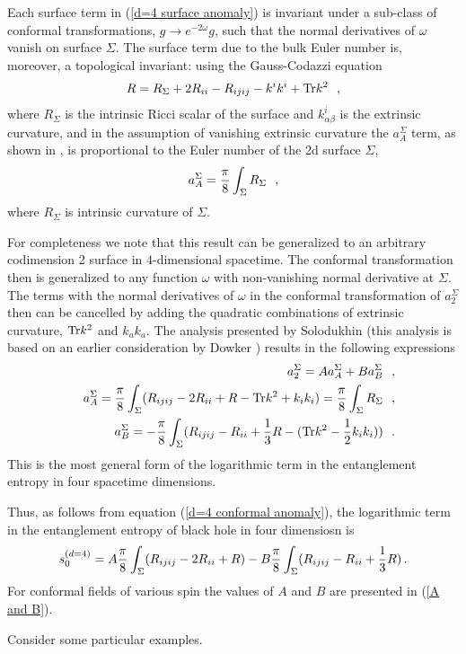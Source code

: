 \documentclass[12pt]{article}
\def\tr{\hbox{Tr}}
\def\be{\begin{eqnarray}}
\def\ee{\end{eqnarray}}
\def\lb{\label}
\begin{document}
Each surface term in (\ref{d=4 surface anomaly}) is invariant
under a sub-class of conformal transformations, $g\rightarrow
e^{-2\omega}g$, such that  the normal derivatives of $\omega$
vanish on surface $\Sigma$. The surface term due to the bulk
Euler number is, moreover, a topological invariant: using the
Gauss-Codazzi equation 
\be R=R_\Sigma +2R_{ii}-R_{ijij}-k^ik^i+\tr
k^2~~,\lb{Gauss-Codazzi} \ee where $R_\Sigma$ is the intrinsic Ricci scalar
of the surface and $k^i_{\alpha\beta}$ is the extrinsic curvature, and in the assumption of
vanishing extrinsic curvature the $a_A^\Sigma$ term, as shown in
\cite{Fursaev:1995ef}, is proportional to the Euler number of the
2d surface $\Sigma$, \be a_A^\Sigma= {\pi\over 8} \int_\Sigma
R_\Sigma~~, \lb{A conformal anomaly} \ee where $R_\Sigma$ is intrinsic curvature
of $\Sigma$.

For completeness we note that this result can be generalized to an arbitrary codimension 2 surface in $4$-dimensional spacetime.  The conformal transformation
then is generalized to any function $\omega$ with non-vanishing normal derivative at $\Sigma$. 
The terms with the normal derivatives of $\omega$ in the conformal
transformation of $a_2^\Sigma$ then can be cancelled by adding the
quadratic combinations of extrinsic curvature, $\tr k^2$ and $k_a
k_a$. The analysis presented by Solodukhin  \cite{Solodukhin:2008dh} (this analysis is based on an earlier consideration by Dowker \cite{Dowker:1994bj})  results in the following expressions
\be
&&a_2^\Sigma=A a_A^\Sigma+B a_B^\Sigma~~, \nonumber \\
 &&a_A^\Sigma={\pi\over 8}\int_\Sigma
(R_{ijij}-2R_{ii}+R-\tr k^2+k_i k_i)={\pi\over 8}\int_\Sigma R_\Sigma~~, \nonumber \\
&&a_B^\Sigma= -{\pi\over 8}\int_\Sigma (R_{ijij}-R_{ii}+{1\over
3}R -(\tr k^2-{1\over 2} k_i k_i ))~~. \lb{general surface anomaly} \ee 
This is  the most general form of the logarithmic term in the entanglement entropy in four spacetime dimensions.

Thus, as follows from  equation (\ref{d=4 conformal anomaly}), the logarithmic term in the entanglement entropy of black hole in four dimensiosn is
\be
s^{(d=4)}_0=A{\pi\over 8}\int_\Sigma
(R_{ijij}-2R_{ii}+R) -B{\pi\over 8}\int_\Sigma (R_{ijij}-R_{ii}+{1\over
3}R)\, .
\lb{d=4 log term}
\ee
For conformal fields of various spin the values of $A$ and $B$ are presented in (\ref{A and B}).

\medskip

Consider some particular examples.
\end{document}
